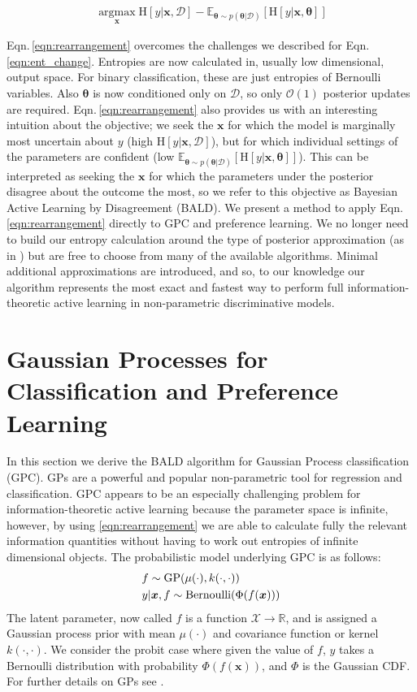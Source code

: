 \documentclass[twoside]{article}
\newcommand{\x}{\bm{x}}
\newcommand{\y}{y}
\newcommand{\data}{\mathcal{D}}
\newcommand{\param}{\bm{\theta}}
\newcommand{\argmax}{ \operatorname*{arg \max}}
\newcommand{\E}{\mathbb{E}}
\newcommand{\rmH}{\mathrm{H}}
\begin{document}
\begin{align}
\argmax_{\x} \rmH[\y \vert \x, \data] - \E_{\param\sim p(\param|\data)} \left[ \rmH[\y \vert \x,\param] \right] \label{eqn:rearrangement} 
\end{align}

Eqn.\,\eqref{eqn:rearrangement} overcomes the challenges we described for Eqn.\,\eqref{eqn:ent_change}. Entropies are now calculated in, usually low dimensional, output space. For binary classification, these are just entropies of Bernoulli variables. Also $\param$ is now conditioned only on $\data$, so only $\mathcal{O}(1)$ posterior updates are required. Eqn.\,\eqref{eqn:rearrangement} also provides us with an interesting intuition about the objective; we seek the $\x$ for which the model is marginally most uncertain about $\y$ (high $\rmH[\y \vert \x, \data]$), but for which individual settings of the parameters are confident (low $\E_{\param\sim p(\param|\data)} \left[ \rmH[\y \vert \x,\param] \right]$). This can be interpreted as seeking the $\x$ for which the parameters under the posterior disagree about the outcome the most, so we refer to this objective as Bayesian Active Learning by Disagreement (BALD). We present a method to apply Eqn.\,\eqref{eqn:rearrangement} directly to GPC and preference learning. We no longer need to build our entropy calculation around the type of posterior approximation (as in \cite{mackay1992, krishnapuram2004, lawrence2003}) but are free to choose from many of the available algorithms. Minimal additional approximations are introduced, and so, to our knowledge our algorithm represents the most exact and fastest way to perform full information-theoretic active learning in non-parametric discriminative models.

\section{Gaussian Processes for Classification and Preference Learning\label{sec:GPC}}

In this section we derive the BALD algorithm for Gaussian Process classification (GPC). GPs are a powerful and popular non-parametric tool for regression and classification. GPC appears to be an especially challenging problem for information-theoretic active learning because the parameter space is infinite, however, by using \eqref{eqn:rearrangement} we are able to calculate fully the relevant information quantities without having to work out entropies of infinite dimensional objects. The probabilistic model underlying GPC is as follows:
\begin{align}
	&f \sim \mathrm{GP}(\mu(\cdot),k(\cdot,\cdot)) \notag \\
	&\y\vert\x,f \sim\mathrm{Bernoulli}(\Phi(f(\x))) \notag
\end{align}
The latent parameter, now called $f$ is a function $\mathcal{X}\rightarrow\mathbb{R}$, and is assigned a Gaussian process prior with mean $\mu(\cdot)$ and covariance function or kernel $k(\cdot,\cdot)$. We consider the probit case where given the value of $f$, $y$ takes a Bernoulli distribution with probability $\Phi(f(\x))$, and $\Phi$ is the Gaussian CDF. For further details on GPs see \cite{rasmussen2005}.
\end{document}
